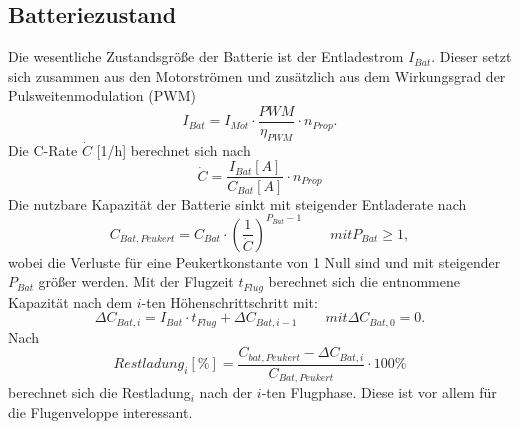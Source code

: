 \subsection{Batteriezustand}
Die wesentliche Zustandsgröße der Batterie ist der Entladestrom \ensuremath{I_{Bat}}. Dieser setzt sich zusammen aus den Motorströmen und zusätzlich aus dem Wirkungsgrad der Pulsweitenmodulation (PWM)
\begin{equation}
	I_{Bat} = I_{Mot}\cdot \frac{PWM}{\eta_{PWM}}\cdot n_{Prop}.  \label{eq:batteriestrom}
\end{equation}
Die C-Rate \ensuremath{\dot{C}} [1/h] berechnet sich nach 
\begin{equation}
	\dot{C} = \frac{I_{Bat}[A]}{C_{Bat}[A]}\cdot n_{Prop}
\end{equation}
Die nutzbare Kapazität der Batterie sinkt mit steigender Entladerate nach
\begin{equation}
	C_{Bat,Peukert} = C_{Bat}\cdot (\frac{1}{\dot{C}})^{P_{Bat}-1} 
	\qquad mit P_{Bat} \geq 1,
\end{equation}
wobei die Verluste für eine Peukertkonstante von 1 Null sind und mit steigender \ensuremath{P_{Bat}} größer werden.
Mit der Flugzeit \ensuremath{t_{Flug}} berechnet sich die entnommene Kapazität nach dem \ensuremath{i}-ten Höhenschrittschritt mit: 
\begin{equation}
	\Delta C_{Bat,i} = I_{Bat}\cdot t_{Flug} + \Delta C_{Bat,i-1} 
	\qquad mit \Delta C_{Bat,0} = 0.
\end{equation}
Nach
\begin{equation}
	Restladung_i[\%] = \frac{C_{bat,Peukert}-\Delta C_{Bat,i}}{C_{Bat,Peukert}}\cdot 100\%
\end{equation}
berechnet sich die Restladung$_{i}$ nach der \ensuremath{i}-ten Flugphase. Diese ist vor allem für die Flugenveloppe interessant.\\

